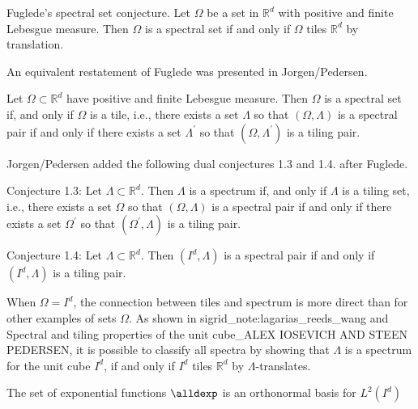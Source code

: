 Fuglede's spectral set conjecture. Let $\Omega$ be a set in $\mathbb{R}^d$ with positive and finite Lebesgue measure. Then $\Omega$ is a spectral set if and only if $\Omega$ tiles $\mathbb{R}^d$ by translation.

An equivalent restatement of Fuglede was presented in Jorgen/Pedersen. 

Let $\Omega \subset \mathbb{R}^d$ have positive and finite Lebesgue measure. Then $\Omega$ is a spectral set if, and only if $\Omega$ is a tile, i.e., there exists a set $\Lambda$ so that $(\Omega, \Lambda)$ is a spectral pair if and only if there exists a set $\Lambda^{\prime}$ so that $\left(\Omega, \Lambda^{\prime}\right)$ is a tiling pair.


Jorgen/Pedersen added the following dual conjectures 1.3 and 1.4. after Fuglede.


Conjecture 1.3: Let $\Lambda \subset \mathbb{R}^d$. Then $\Lambda$ is a spectrum if, and only if $\Lambda$ is a tiling set, i.e., there exists a set $\Omega$ so that $(\Omega, \Lambda)$ is a spectral pair if and only if there exists a set $\Omega^{\prime}$ so that $\left(\Omega^{\prime}, \Lambda\right)$ is a tiling pair.

Conjecture 1.4: Let $\Lambda \subset \mathbb{R}^d$. Then $\left(I^d, \Lambda\right)$ is a spectral pair if and only if $\left(I^d, \Lambda\right)$ is a tiling pair.

When $\Omega = I^d$, the connection between tiles and spectrum is more direct than for other examples of sets $\Omega$. As shown in sigrid_note:lagarias_reeds_wang and Spectral and tiling properties of the unit cube_ALEX IOSEVICH AND STEEN PEDERSEN, it is possible to classify all spectra by showing that $\Lambda$ is a spectrum for the unit cube $I^d$, if and only if $I^d$ tiles $\mathbb{R}^d$ by $\Lambda$-translates.



\begin{lemma}
    The set of exponential functions $\alldexp$ is an orthonormal basis for $L^2(I^d)$
\end{lemma}

